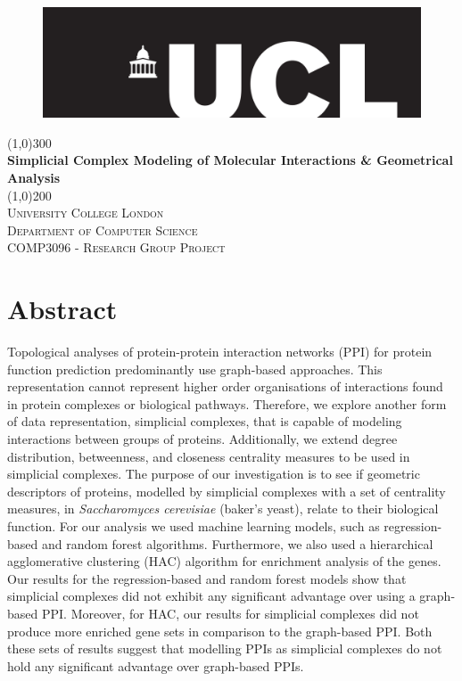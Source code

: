 \documentclass[9pt]{article}
\begin{document}
\begin{titlepage}
\begin{center}
\begin{figure}[t]
\hspace*{0.35cm}\includegraphics[width=1.0\textwidth]{uclLogo}\\
\end{figure}
\line(1,0){300}\\
[0.25in]
\huge{\bfseries Simplicial Complex Modeling of Molecular Interactions \& Geometrical Analysis}\\
[2mm]
\line(1,0){200}\\
[1.5cm]
\textsc{\LARGE University College London}\\
\textsc{\normalsize Department of Computer Science}\\
\textsc{\normalsize COMP3096 - Research Group Project}\\
[5cm]
\end{center}

\end{titlepage}

\newpage
\section{Abstract}\label{sec:abstract}
Topological analyses of protein-protein interaction networks (PPI) for protein function prediction predominantly use graph-based approaches. This representation cannot represent higher order organisations of interactions found in protein complexes or biological pathways. Therefore, we explore another form of data representation, simplicial complexes, that is capable of modeling interactions between groups of proteins. Additionally, we extend degree distribution, betweenness, and closeness centrality measures to be used in simplicial complexes. The purpose of our investigation is to see if geometric descriptors of proteins, modelled by simplicial complexes with a set of centrality measures, in \textit{Saccharomyces cerevisiae} (baker’s yeast), relate to their biological function. For our analysis we used machine learning models, such as regression-based and random forest algorithms. Furthermore, we also used a hierarchical agglomerative clustering (HAC) algorithm for enrichment analysis of the genes. Our results for the regression-based and random forest models show that simplicial complexes did not exhibit any significant advantage over using a graph-based PPI. Moreover, for HAC, our results for simplicial complexes did not produce more enriched gene sets in comparison to the graph-based PPI. Both these sets of results suggest that modelling PPIs as simplicial complexes do not hold any significant advantage over graph-based PPIs.
\end{document}
